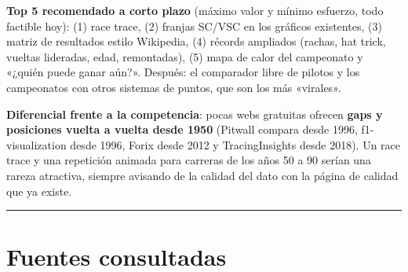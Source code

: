 \textbf{Top 5 recomendado a corto plazo} (máximo valor y mínimo esfuerzo, todo factible hoy): (1) race trace, (2) franjas SC/VSC en los gráficos existentes, (3) matriz de resultados estilo Wikipedia, (4) récords ampliados (rachas, hat trick, vueltas lideradas, edad, remontadas), (5) mapa de calor del campeonato y «¿quién puede ganar aún?». Después: el comparador libre de pilotos y los campeonatos con otros sistemas de puntos, que son los más «virales».

\textbf{Diferencial frente a la competencia}: pocas webs gratuitas ofrecen \textbf{gaps y posiciones vuelta a vuelta desde 1950} (Pitwall compara desde 1996, f1-visualization desde 1996, Forix desde 2012 y TracingInsights desde 2018). Un race trace y una repetición animada para carreras de los años 50 a 90 serían una rareza atractiva, siempre avisando de la calidad del dato con la página de calidad que ya existe.

\medskip\noindent\textcolor{muted!40}{\rule{\linewidth}{0.3pt}}\medskip

\section{Fuentes consultadas}

